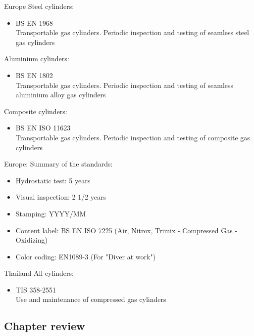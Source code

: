 \documentclass[aspectratio=1610,english,12pt]{beamer}
\begin{document}
\begin{frame}{Europe}
	Steel cylinders:
	\begin{itemize}
		\item BS EN 1968\\Transportable gas cylinders. Periodic inspection and testing of seamless steel gas cylinders
	\end{itemize}
	Aluminium cylinders:	
	\begin{itemize}
		\item BS EN 1802\\Transportable gas cylinders. Periodic inspection and testing of seamless aluminium alloy gas cylinders
	\end{itemize}
	Composite cylinders:
	\begin{itemize}
		\item BS EN ISO 11623\\Transportable gas cylinders. Periodic inspection and testing of composite gas cylinders
	\end{itemize}
\end{frame}

\begin{frame}{Europe:}
	Summary of the standards:
	\begin{itemize}
		\item Hydrostatic test: 5 years
		\item Visual inspection: 2 1/2 years
		\item Stamping: YYYY/MM
		\item Content label: BS EN ISO 7225 (Air, Nitrox, Trimix -  Compressed Gas - Oxidizing)
		\item Color coding: EN1089-3 (For "Diver at work") 
	\end{itemize}
\end{frame}

\begin{frame}{Thailand}  
	All cylinders:
	\begin{itemize}
		\item TIS 358-2551\\Use and maintenance of compressed gas cylinders
	\end{itemize}
\end{frame}

\subsection{Chapter review}
\end{document}
